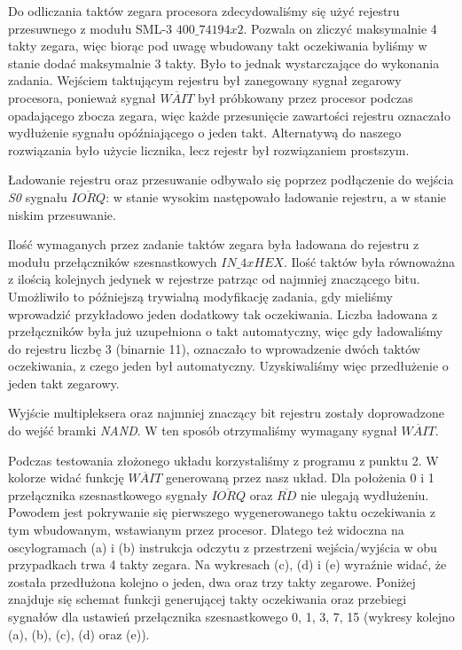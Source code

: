 \documentclass[fleqn]{article}
\newcommand\square[1]{
	\fcolorbox{black}{#1}{\rule{0pt}{6pt}\rule{6pt}{0pt}}
}
\begin{document}
Do odliczania taktów zegara procesora zdecydowaliśmy się użyć rejestru przesuwnego z modułu SML-3 ${400\_74194x2}$. Pozwala on zliczyć maksymalnie 4 takty zegara, więc biorąc pod uwagę wbudowany takt oczekiwania byliśmy w stanie dodać maksymalnie 3 takty. Było to jednak wystarczające do wykonania zadania. Wejściem taktującym rejestru był zanegowany sygnał zegarowy procesora, ponieważ sygnał $\overline{WAIT}$ był próbkowany przez procesor podczas opadającego zbocza zegara, więc każde przesunięcie zawartości rejestru oznaczało wydłużenie sygnału opóźniającego o jeden takt. Alternatywą do naszego rozwiązania było użycie licznika, lecz rejestr był rozwiązaniem prostszym.

Ładowanie rejestru oraz przesuwanie odbywało się poprzez podłączenie do wejścia \textit{S0} sygnału $\overline{IORQ}$: w stanie wysokim następowało ładowanie rejestru, a w stanie niskim przesuwanie.

Ilość wymaganych przez zadanie taktów zegara była ładowana do rejestru z modułu przełączników szesnastkowych ${IN\_4xHEX}$. Ilość taktów była równoważna z ilością kolejnych jedynek w rejestrze patrząc od najmniej znaczącego bitu. Umożliwiło to późniejszą trywialną modyfikację zadania, gdy mieliśmy wprowadzić przykładowo jeden dodatkowy tak oczekiwania. Liczba ładowana z przełączników była już uzupełniona o takt automatyczny, więc gdy ładowaliśmy do rejestru liczbę 3 (binarnie 11), oznaczało to wprowadzenie dwóch taktów oczekiwania, z czego jeden był automatyczny. Uzyskiwaliśmy więc przedłużenie o jeden takt zegarowy.

Wyjście multipleksera oraz najmniej znaczący bit rejestru zostały doprowadzone do wejść bramki \textit{NAND}. W ten sposób otrzymaliśmy wymagany sygnał $\overline{WAIT}$.

Podczas testowania złożonego układu korzystaliśmy z programu z punktu 2.  W kolorze \square{blue} widać funkcję $\overline{WAIT}$ generowaną przez nasz układ. Dla położenia 0 i 1 przełącznika szesnastkowego sygnały $\overline{IORQ}$ oraz $\overline{RD}$ nie ulegają wydłużeniu. Powodem jest pokrywanie się pierwszego wygenerowanego taktu oczekiwania z tym wbudowanym, wstawianym przez procesor. Dlatego też widoczna na oscylogramach (a) i (b) instrukcja odczytu z przestrzeni wejścia/wyjścia w obu przypadkach trwa 4 takty zegara. Na wykresach (c), (d) i (e) wyraźnie widać, że została przedłużona kolejno o jeden, dwa oraz trzy takty zegarowe. Poniżej znajduje się schemat funkcji generującej takty oczekiwania oraz przebiegi sygnałów dla ustawień przełącznika szesnastkowego 0, 1, 3, 7, 15 (wykresy kolejno (a), (b), (c), (d) oraz (e)).
\end{document}
